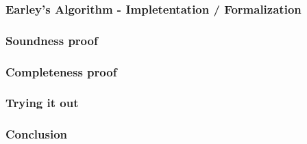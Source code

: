 \documentclass{beamer}
\begin{document}
	\begin{frame}
		\frametitle{Earley's Algorithm - Impletentation / Formalization}
	\end{frame}

	\begin{frame}
		\frametitle{Soundness proof}
	\end{frame}

	\begin{frame}
		\frametitle{Completeness proof}
	\end{frame}

	\begin{frame}
		\frametitle{Trying it out}
	\end{frame}

	\begin{frame}
		\frametitle{Conclusion}
	\end{frame}
	
\end{document}
